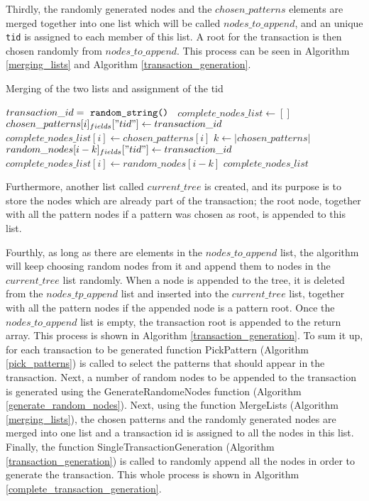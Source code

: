\documentclass{acm_proc_article-sp-sigmod09}
\begin{document}
Thirdly, the randomly generated nodes and the $chosen\_patterns$ elements are merged together into one list which will be called $nodes\_to\_append$, and an unique \texttt{tid} is assigned to each member of this list. A root for the transaction is then chosen randomly from $nodes\_to\_append$. This process can be seen in Algorithm \ref{merging_lists} and Algorithm \ref{transaction_generation}.

\begin{algorithm}
\caption{Merging of the two lists and assignment of the tid}
\label{merging_lists}
\begin{algorithmic}[1]
\State $transaction\_id = \text{ \texttt{random\_string() }}$
\State $complete\_nodes\_list \gets []$
    \State $chosen\_patterns[i]_{fields}["tid"] \gets transaction\_id$
    \State $complete\_nodes\_list[i] \gets chosen\_patterns[i]$
\EndFor
\State $k \gets |chosen\_patterns|$
    \State $random\_nodes[i - k]_{fields}["tid"] \gets transaction\_id$
    \State $complete\_nodes\_list[i] \gets random\_nodes[i - k]$
\EndFor
\Return $complete\_nodes\_list$
\EndFunction
\end{algorithmic}
\end{algorithm}

Furthermore, another list called $current\_tree$ is created, and its purpose is to store the nodes which are already part of the transaction; the root node, together with all the pattern nodes if a pattern was chosen as root, is appended to this list.

Fourthly, as long as there are elements in the $nodes\_to\_append$ list, the algorithm will keep choosing random nodes from it and append them to nodes in the $current\_tree$ list randomly. When a node is appended to the tree, it is deleted from the $nodes\_tp\_append$ list and inserted into the $current\_tree$ list, together with all the pattern nodes if the appended node is a pattern root. Once the $nodes\_to\_append$ list is empty, the transaction root is appended to the return array. This process is shown in Algorithm \ref{transaction_generation}. To sum it up, for each transaction to be generated function PickPattern (Algorithm \ref{pick_patterns}) is called to select the patterns that should appear in the transaction. Next, a number of random nodes to be appended to the transaction is generated using the GenerateRandomeNodes function (Algorithm \ref{generate_random_nodes}). Next, using the function MergeLists (Algorithm \ref{merging_lists}), the chosen patterns and the randomly generated nodes are merged into one list and a transaction id is assigned to all the nodes in this list. Finally, the function SingleTransactionGeneration (Algorithm \ref{transaction_generation}) is called to randomly append all the nodes in order to generate the transaction. This whole process is shown in Algorithm \ref{complete_transaction_generation}.
\end{document}
